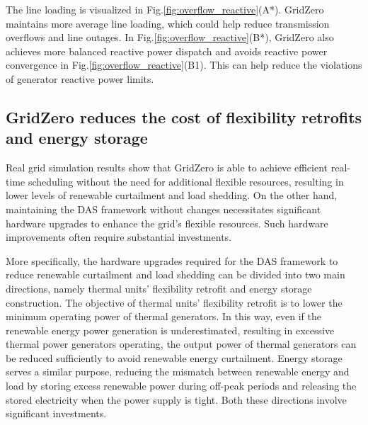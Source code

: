 The line loading is visualized in Fig.\ref{fig:overflow_reactive}(A*). GridZero maintains more average line loading, which could help reduce transmission overflows and line outages. In Fig.\ref{fig:overflow_reactive}(B*), GridZero also achieves more balanced reactive power dispatch and avoids reactive power convergence in Fig.\ref{fig:overflow_reactive}(B1). This can help reduce the violations of generator reactive power limits.



\subsection*{GridZero reduces the cost of flexibility retrofits and energy storage}
Real grid simulation results show that GridZero is able to achieve efficient real-time scheduling without the need for additional flexible resources, resulting in lower levels of renewable curtailment and load shedding. On the other hand, maintaining the DAS framework without changes necessitates significant hardware upgrades to enhance the grid's flexible resources. Such hardware improvements often require substantial investments.
 
More specifically, the hardware upgrades required for the DAS framework to reduce renewable curtailment and load shedding can be divided into two main directions, namely thermal units' flexibility retrofit and energy storage construction.
The objective of thermal units' flexibility retrofit is to lower the minimum operating power of thermal generators. 
In this way, even if the renewable energy power generation is underestimated, resulting in excessive thermal power generators operating, the output power of thermal generators can be reduced sufficiently to avoid renewable energy curtailment.
Energy storage serves a similar purpose, reducing the mismatch between renewable energy and load by storing excess renewable power during off-peak periods and releasing the stored electricity when the power supply is tight.
Both these directions involve significant investments. 

